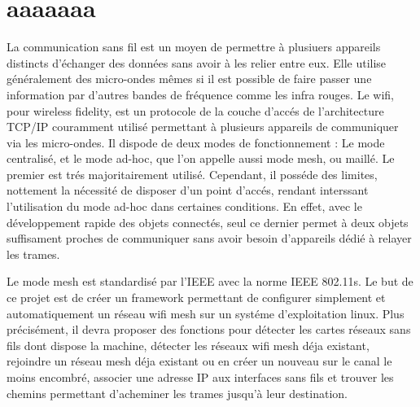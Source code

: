\chapter*{aaaaaaa}

La communication sans fil est un moyen de permettre à plusiuers appareils distincts d'échanger des données sans avoir à les relier
entre eux. Elle utilise généralement des micro-ondes mêmes si il est possible de faire passer une information par d'autres bandes de
fréquence comme les infra rouges. Le wifi, pour wireless fidelity, est un protocole de la couche d'accés de l'architecture TCP/IP
couramment utilisé permettant à plusieurs appareils de communiquer via les micro-ondes. Il dispode de deux modes de fonctionnement : 
Le mode centralisé, et le mode ad-hoc, que l'on appelle aussi mode mesh, ou maillé. Le premier est trés majoritairement utilisé. 
Cependant, il posséde des limites, nottement la nécessité de disposer d'un point d'accés, rendant interssant l'utilisation du mode
ad-hoc dans certaines conditions. En effet, avec le développement rapide des objets connectés, seul ce dernier permet à deux objets
suffisament proches de communiquer sans avoir besoin d'appareils dédié à relayer les trames.

Le mode mesh est standardisé par l'IEEE avec la norme IEEE 802.11s. Le but de ce projet est de créer un framework permettant de
configurer simplement et automatiquement un réseau wifi mesh sur un systéme d'exploitation linux. Plus précisément, il devra proposer
des fonctions pour détecter les cartes réseaux sans fils dont dispose la machine, détecter les réseaux wifi mesh déja existant,
rejoindre un réseau mesh déja existant ou en créer un nouveau sur le canal le moins encombré, associer une adresse IP aux interfaces
sans fils et trouver les chemins permettant d'acheminer les trames jusqu'à leur destination.




